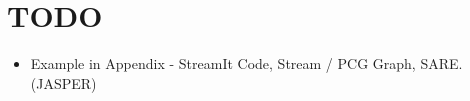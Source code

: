 \section*{TODO}

\begin{itemize}

\item Example in Appendix - StreamIt Code, Stream / PCG Graph, SARE. (JASPER)

\end{itemize}

